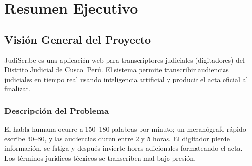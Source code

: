\documentclass[12pt,a4paper]{report}
\begin{document}
\newpage
\thispagestyle{empty}
\mbox{}

\newpage
\tableofcontents

\newpage
\listoftables
{}

\newpage
\setcounter{page}{1}

\chapter{Resumen Ejecutivo}

\section{Visión General del Proyecto}

JudiScribe es una aplicación web para transcriptores judiciales (digitadores) del Distrito Judicial de Cusco, Perú. El sistema permite transcribir audiencias judiciales en tiempo real usando inteligencia artificial y producir el acta oficial al finalizar.

\subsection{Descripción del Problema}

El habla humana ocurre a 150--180 palabras por minuto; un mecanógrafo rápido escribe 60--80, y las audiencias duran entre 2 y 5 horas. El digitador pierde información, se fatiga y después invierte horas adicionales formateando el acta. Los términos jurídicos técnicos se transcriben mal bajo presión.
\end{document}
